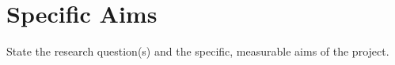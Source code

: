 \section{Specific Aims}

State the research question(s) and the specific, measurable aims of the project.
